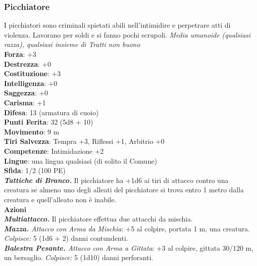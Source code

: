 \begin{multicols}{2}
\subsubsection{Picchiatore}
I picchiatori sono criminali spietati abili nell'intimidire e perpetrare atti di violenza. Lavorano per soldi e si fanno pochi scrupoli.
\emph{Media umanoide (qualsiasi razza), qualsiasi insieme di Tratti non buono}\\
\textbf{Forza}: +3\\
\textbf{Destrezza}: +0\\
\textbf{Costituzione}: +3\\
\textbf{Intelligenza}: +0\\
\textbf{Saggezza}: +0\\
\textbf{Carisma}: +1\\
\textbf{Difesa}: 13 (armatura di cuoio)\\
\textbf{Punti Ferita}: 32 (5d8 + 10)\\
\textbf{Movimento}: 9 m\\
\textbf{Tiri Salvezza}: Tempra +3, Riflessi +1, Arbitrio +0 \\
\textbf{Competenze}: Intimidazione +2\\
\textbf{Lingue}: una lingua qualsiasi (di solito il Comune)\\
\textbf{Sfida}: 1/2 (100 PE)\smallskip\\
\emph{\textbf{Tattiche di Branco.}} Il picchiatore ha +1d6 ai tiri di attacco contro una creatura se almeno uno degli alleati del picchiatore si trova entro 1 metro dalla creatura e quell'alleato non è inabile.\\
\smallskip\textbf{Azioni} \\
\emph{\textbf{Multiattacco.}} Il picchiatore effettua due attacchi da mischia.\\
\emph{\textbf{Mazza.} Attacco con Arma da Mischia}: +5 al colpire, portata 1 m, una creatura.\\
\emph{Colpisce:} 5 (1d6 + 2) danni contundenti.\\
\emph{\textbf{Balestra Pesante.} Attacco con Arma a Gittata}: +3 al colpire, gittata 30/120 m, un bersaglio. \emph{Colpisce:} 5 (1d10) danni perforanti.\\


\end{multicols}
